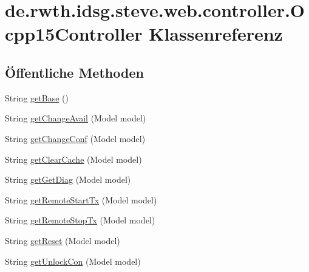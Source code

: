 \hypertarget{classde_1_1rwth_1_1idsg_1_1steve_1_1web_1_1controller_1_1_ocpp15_controller}{\section{de.\-rwth.\-idsg.\-steve.\-web.\-controller.\-Ocpp15\-Controller Klassenreferenz}
\label{classde_1_1rwth_1_1idsg_1_1steve_1_1web_1_1controller_1_1_ocpp15_controller}
}
\subsection*{Öffentliche Methoden}
\begin{DoxyCompactItemize}
\item 
String \hyperlink{classde_1_1rwth_1_1idsg_1_1steve_1_1web_1_1controller_1_1_ocpp15_controller_a3481986f86b5be140f826831bb3d676c}{get\-Base} ()
\item 
String \hyperlink{classde_1_1rwth_1_1idsg_1_1steve_1_1web_1_1controller_1_1_ocpp15_controller_ad481884cd9548303aa7c58c25cc63b4c}{get\-Change\-Avail} (Model model)
\item 
String \hyperlink{classde_1_1rwth_1_1idsg_1_1steve_1_1web_1_1controller_1_1_ocpp15_controller_a119be5f24d02c49bcb3a95b0ab405891}{get\-Change\-Conf} (Model model)
\item 
String \hyperlink{classde_1_1rwth_1_1idsg_1_1steve_1_1web_1_1controller_1_1_ocpp15_controller_ad6a7442824690cff245c1754a72428f4}{get\-Clear\-Cache} (Model model)
\item 
String \hyperlink{classde_1_1rwth_1_1idsg_1_1steve_1_1web_1_1controller_1_1_ocpp15_controller_a361159deccf7c0e6e219ae4e8601ccc5}{get\-Get\-Diag} (Model model)
\item 
String \hyperlink{classde_1_1rwth_1_1idsg_1_1steve_1_1web_1_1controller_1_1_ocpp15_controller_a5fb2eea1de5be3c4afce79b33fc1f581}{get\-Remote\-Start\-Tx} (Model model)
\item 
String \hyperlink{classde_1_1rwth_1_1idsg_1_1steve_1_1web_1_1controller_1_1_ocpp15_controller_a3b350258a32396ee42446a227c215446}{get\-Remote\-Stop\-Tx} (Model model)
\item 
String \hyperlink{classde_1_1rwth_1_1idsg_1_1steve_1_1web_1_1controller_1_1_ocpp15_controller_a762c40d8f5a71064fbd6e019b409ee02}{get\-Reset} (Model model)
\item 
String \hyperlink{classde_1_1rwth_1_1idsg_1_1steve_1_1web_1_1controller_1_1_ocpp15_controller_a7d438dd47d85d3c9f1dc1c8f806fdc39}{get\-Unlock\-Con} (Model model)

\end{DoxyCompactItemize}
